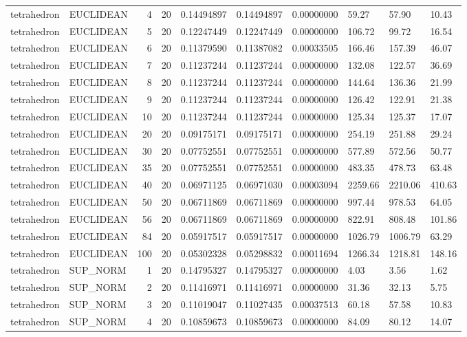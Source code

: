 \begin{longtable}{llrrllllll}
tetrahedron & EUCLIDEAN & 4 & 20 & 0.14494897 & 0.14494897 & 0.00000000 & 59.27 & 57.90 & 10.43 \\
tetrahedron & EUCLIDEAN & 5 & 20 & 0.12247449 & 0.12247449 & 0.00000000 & 106.72 & 99.72 & 16.54 \\
tetrahedron & EUCLIDEAN & 6 & 20 & 0.11379590 & 0.11387082 & 0.00033505 & 166.46 & 157.39 & 46.07 \\
tetrahedron & EUCLIDEAN & 7 & 20 & 0.11237244 & 0.11237244 & 0.00000000 & 132.08 & 122.57 & 36.69 \\
tetrahedron & EUCLIDEAN & 8 & 20 & 0.11237244 & 0.11237244 & 0.00000000 & 144.64 & 136.36 & 21.99 \\
tetrahedron & EUCLIDEAN & 9 & 20 & 0.11237244 & 0.11237244 & 0.00000000 & 126.42 & 122.91 & 21.38 \\
tetrahedron & EUCLIDEAN & 10 & 20 & 0.11237244 & 0.11237244 & 0.00000000 & 125.34 & 125.37 & 17.07 \\
tetrahedron & EUCLIDEAN & 20 & 20 & 0.09175171 & 0.09175171 & 0.00000000 & 254.19 & 251.88 & 29.24 \\
tetrahedron & EUCLIDEAN & 30 & 20 & 0.07752551 & 0.07752551 & 0.00000000 & 577.89 & 572.56 & 50.77 \\
tetrahedron & EUCLIDEAN & 35 & 20 & 0.07752551 & 0.07752551 & 0.00000000 & 483.35 & 478.73 & 63.48 \\
tetrahedron & EUCLIDEAN & 40 & 20 & 0.06971125 & 0.06971030 & 0.00003094 & 2259.66 & 2210.06 & 410.63 \\
tetrahedron & EUCLIDEAN & 50 & 20 & 0.06711869 & 0.06711869 & 0.00000000 & 997.44 & 978.53 & 64.05 \\
tetrahedron & EUCLIDEAN & 56 & 20 & 0.06711869 & 0.06711869 & 0.00000000 & 822.91 & 808.48 & 101.86 \\
tetrahedron & EUCLIDEAN & 84 & 20 & 0.05917517 & 0.05917517 & 0.00000000 & 1026.79 & 1006.79 & 63.29 \\
tetrahedron & EUCLIDEAN & 100 & 20 & 0.05302328 & 0.05298832 & 0.00011694 & 1266.34 & 1218.81 & 148.16 \\
tetrahedron & SUP\_NORM & 1 & 20 & 0.14795327 & 0.14795327 & 0.00000000 & 4.03 & 3.56 & 1.62 \\
tetrahedron & SUP\_NORM & 2 & 20 & 0.11416971 & 0.11416971 & 0.00000000 & 31.36 & 32.13 & 5.75 \\
tetrahedron & SUP\_NORM & 3 & 20 & 0.11019047 & 0.11027435 & 0.00037513 & 60.18 & 57.58 & 10.83 \\
tetrahedron & SUP\_NORM & 4 & 20 & 0.10859673 & 0.10859673 & 0.00000000 & 84.09 & 80.12 & 14.07 \\

\end{longtable}
